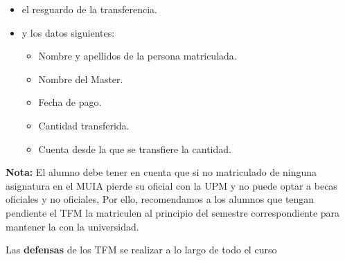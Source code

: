 \begin{itemize}
	\item el resguardo de la transferencia.
	\item y los datos siguientes:     
	\begin{itemize}
		\item Nombre y apellidos de la persona matriculada.
		\item Nombre del Master.
		\item Fecha de pago.
		\item Cantidad transferida.
		\item Cuenta desde la que se transfiere la cantidad.
	\end{itemize}
\end{itemize}

{\bf Nota:} El alumno debe tener en cuenta que si no  matriculado de ninguna asignatura en el MUIA pierde su  oficial con la UPM y no puede optar a becas oficiales y no oficiales,  Por ello, recomendamos a los alumnos que  tengan pendiente el TFM la matriculen al principio del semestre correspondiente para mantener la  con la universidad.

Las {\bf defensas} de los TFM se  realizar a lo largo de todo el curso

